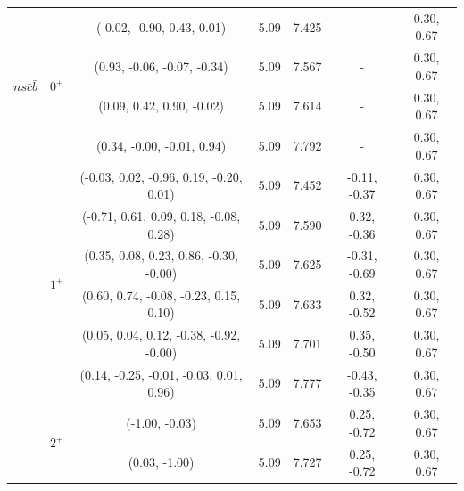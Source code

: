 \documentclass[prt,twocolumn,floatfix,nofootinbib]{revtex4}
\begin{document}
\begin{table}[!htbp]
\begin{tabular}{ccccccc}
        \multirow{4}{*}{$ns\bar{c}\bar{b}$}
                        &\multirow{4}{*}{$0^{+}$}
                                    &(-0.02, -0.90, 0.43, 0.01)                 &5.09	    &7.425	    &-              &0.30, 0.67 \\
                        &           &(0.93, -0.06, -0.07, -0.34)                &5.09	    &7.567	    &-              &0.30, 0.67 \\
                        &           &(0.09, 0.42, 0.90, -0.02)                  &5.09	    &7.614	    &-              &0.30, 0.67 \\
                        &           &(0.34, -0.00, -0.01, 0.94)                 &5.09	    &7.792	    &-              &0.30, 0.67 \\
                        &\multirow{6}{*}{$1^{+}$}
                                    &(-0.03, 0.02, -0.96, 0.19, -0.20, 0.01)    &5.09	    &7.452	    &-0.11, -0.37   &0.30, 0.67 \\
                        &           &(-0.71, 0.61, 0.09, 0.18, -0.08, 0.28)     &5.09	    &7.590	    &0.32, -0.36    &0.30, 0.67 \\
                        &           &(0.35, 0.08, 0.23, 0.86, -0.30, -0.00)     &5.09	    &7.625	    &-0.31, -0.69   &0.30, 0.67 \\
                        &           &(0.60, 0.74, -0.08, -0.23, 0.15, 0.10)     &5.09	    &7.633	    &0.32, -0.52    &0.30, 0.67 \\
                        &           &(0.05, 0.04, 0.12, -0.38, -0.92, -0.00)    &5.09	    &7.701	    &0.35, -0.50    &0.30, 0.67 \\
                        &           &(0.14, -0.25, -0.01, -0.03, 0.01, 0.96)    &5.09	    &7.777	    &-0.43, -0.35   &0.30, 0.67 \\
                        &\multirow{2}{*}{$2^{+}$}
                                    &(-1.00, -0.03)                             &5.09	    &7.653	    &0.25, -0.72    &0.30, 0.67 \\
                        &           &(0.03, -1.00)                              &5.09	    &7.727	    &0.25, -0.72    &0.30, 0.67 \\
        \hline\hline
    \end{tabular}
\end{table}
\end{document}
